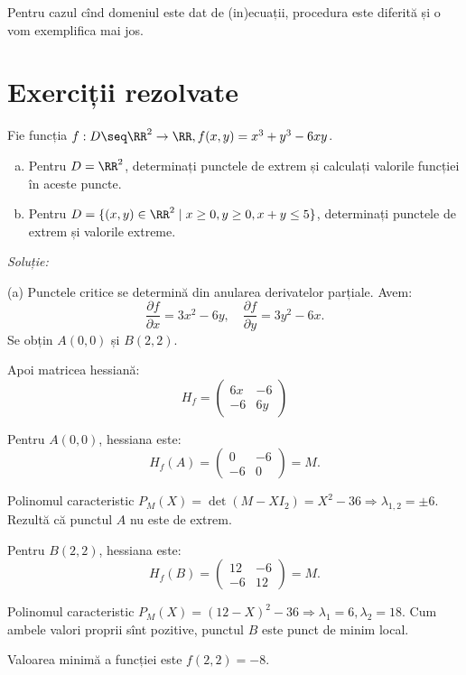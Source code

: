 Pentru cazul cînd domeniul este dat de (in)ecuații, procedura este diferită
și o vom exemplifica mai jos.


\section{Exerciții rezolvate}

Fie funcția $ f : D \seq \RR^2 \to \RR, f(x, y) = x^3 + y^3 - 6xy $.
\begin{enumerate}[(a)]
\item Pentru $ D = \RR^2 $, determinați punctele de extrem și calculați
  valorile funcției în aceste puncte.
\item Pentru $ D = \{ (x, y) \in \RR^2 \mid x \geq 0, y \geq 0, x + y \leq 5 \} $,
  determinați punctele de extrem și valorile extreme.
\end{enumerate}

\emph{Soluție:}

(a) Punctele critice se determină din anularea derivatelor parțiale. Avem:
\[
  \frac{\partial f}{\partial x} = 3x^2 - 6y, \quad %
  \frac{\partial f}{\partial y} = 3y^2 - 6x.
\]
Se obțin $ A(0, 0) $ și $ B(2, 2) $.

Apoi matricea hessiană:
\[
  H_f = \begin{pmatrix}
    6x & -6 \\
    -6 & 6y
  \end{pmatrix}
\]

Pentru $ A(0, 0) $, hessiana este:
\[
  H_f(A) = \begin{pmatrix}
    0 & -6 \\
    -6 & 0
  \end{pmatrix} = M.
\]

Polinomul caracteristic $ P_M(X) = \det (M - XI_2) = X^2 - 36 \Rightarrow \lambda_{1,2} = \pm 6 $.
Rezultă că punctul $ A $ nu este de extrem.

Pentru $ B(2, 2) $, hessiana este:
\[
  H_f(B) = \begin{pmatrix}
    12 & -6 \\
    -6 & 12
  \end{pmatrix} = M.
\]

Polinomul caracteristic $ P_M(X) = (12 - X)^2 - 36 \Rightarrow \lambda_1 = 6, \lambda_2 = 18 $.
Cum ambele valori proprii sînt pozitive, punctul $ B $ este punct de minim local.

Valoarea minimă a funcției este $ f(2, 2) = -8 $.

